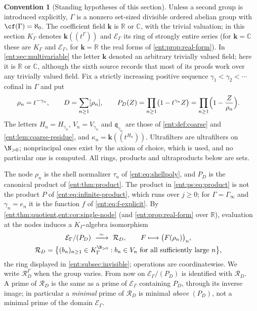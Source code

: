 \documentclass[11pt]{article}
\theoremstyle{plain}
\theoremstyle{plain}
\theoremstyle{plain}
\theoremstyle{definition}
\theoremstyle{definition}
\newtheorem{convention}[convention]{Convention}
\theoremstyle{definition}
\theoremstyle{definition}
\theoremstyle{remark}
\newcommand{\C}{\mathbb C}\newcommand{\R}{\mathbb R}
\newcommand{\K}{K_\Gamma}\newcommand{\KD}{K_\Delta}
\newcommand{\E}{\mathcal E_\Gamma}
\newcommand{\RD}{\mathcal R_D}\newcommand{\Ucal}{\mathcal U}
\newcommand{\kk}{\mathbf k}\newcommand{\PP}{\mathbb P}
\begin{document}
\begin{convention}[Standing hypotheses of this section]
\label{ent:ps:conv:standing}
Unless a second group is introduced explicitly, $\Gamma$ is a nonzero
set-sized divisible ordered abelian group with $\cf(\Gamma)=\aleph_0$. The
coefficient field $\kk$ is $\R$ or $\C$, with the trivial valuation; in this
section $K_\Gamma$ denotes $\kk((t^\Gamma))$ and $\mathcal E_\Gamma$ its
ring of strongly entire series (for $\kk=\C$ these are $\K$ and $\E$, for
$\kk=\R$ the real forms of \cref{ent:prop:real-form}). In
\cref{ent:sec:multivariable} the letter $\kk$ denoted an arbitrary trivially
valued field; here it is $\R$ or $\C$, although the sixth source records that
most of its proofs work over any trivially valued field. Fix a strictly
increasing positive sequence $\gamma_1<\gamma_2<\cdots$ cofinal in $\Gamma$
and put
\begin{equation}\label{ent:ps:eq:product}
 \rho_n=t^{-\gamma_n},\qquad
 D=\sum_{n\ge1}[\rho_n],\qquad
 P_D(Z)=\prod_{n\ge1}\bigl(1-t^{\gamma_n}Z\bigr)
       =\prod_{n\ge1}\Bigl(1-\frac Z{\rho_n}\Bigr).
\end{equation}
The letters $H_n=H_{\gamma_n}$, $V_n=V_{\gamma_n}$ and
$\mathfrak q_{\gamma_n}$ are those of \cref{ent:def:coarse} and
\cref{ent:lem:coarse-residue}, and $\kappa_n=\kk((t^{H_n}))$. Ultrafilters
are ultrafilters on $\N_{>0}$; nonprincipal ones exist by the axiom of choice,
which is used, and no particular one is computed. All rings, products and
ultraproducts below are sets.
\end{convention}

The node $\rho_n$ is the shell normalizer $\tau_n$ of
\eqref{ent:eq:shellpoly}, and $P_D$ is the canonical product of
\cref{ent:thm:product}. The product in \eqref{ent:ps:eq:product} is not the
product $P$ of \eqref{ent:eq:infinite-product}, which runs over $j\ge0$; for
$\Gamma=\Gamma_\infty$ and $\gamma_n=e_n$ it is the function $f$ of
\eqref{ent:eq:f-explicit}. By \cref{ent:thm:quotient,ent:cor:single-node}
(and \cref{ent:prop:real-form} over $\R$), evaluation at the nodes induces a
$K_\Gamma$-algebra isomorphism
\begin{equation}\label{ent:ps:eq:quotient}
 \begin{gathered}
 \mathcal E_\Gamma/(P_D)\ \xrightarrow{\ \sim\ }\ \RD,
 \qquad F\longmapsto\bigl(F(\rho_n)\bigr)_n ,\\
 \RD=\bigl\{(b_n)_{n\ge1}\in K_\Gamma^{\N_{>0}}:
      b_n\in V_n\text{ for all sufficiently large }n\bigr\},
 \end{gathered}
\end{equation}
the ring displayed in \cref{ent:subsec:invisible}; operations
are coordinatewise. We write $\RD^\Gamma$ when the group varies. From now on
$\mathcal E_\Gamma/(P_D)$ is identified with $\RD$. A prime of $\RD$ is the
same as a prime of $\mathcal E_\Gamma$ containing $P_D$, through its inverse
image; in particular a \emph{minimal} prime of $\RD$ is minimal \emph{above}
$(P_D)$, not a minimal prime of the domain $\mathcal E_\Gamma$.
\end{document}
